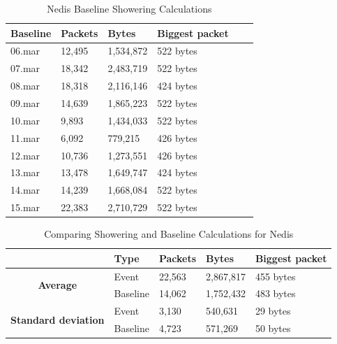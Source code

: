 \begin{table}[H]
    \centering
    \caption{Nedis Baseline Showering Calculations}
    \begin{tabular}{|l|l|l|l|l|l|}
    \hline
        \textbf{Baseline} & \textbf{Packets} & \textbf{Bytes} & \textbf{Biggest packet} \\ \hline
        06.mar & 12,495 & 1,534,872 & 522 bytes \\ \hline
        07.mar & 18,342 & 2,483,719 & 522 bytes \\ \hline
        08.mar & 18,318 & 2,116,146 & 424 bytes \\ \hline
        09.mar & 14,639 & 1,865,223 & 522 bytes \\ \hline
        10.mar & 9,893  & 1,434,033 & 522 bytes \\ \hline
        11.mar & 6,092  & 779,215   & 426 bytes \\ \hline
        12.mar & 10,736 & 1,273,551 & 426 bytes \\ \hline
        13.mar & 13,478 & 1,649,747 & 424 bytes \\ \hline
        14.mar & 14,239 & 1,668,084 & 522 bytes \\ \hline
        15.mar & 22,383 & 2,710,729 & 522 bytes \\ \hline
    \end{tabular}
    \label{tab:NedisBaselineShowerCalculations}
\end{table}

\begin{table}[H]
    \centering
    \caption{Comparing Showering and Baseline Calculations for Nedis}
    \begin{tabular}{c|l|l|l|l|}
        \cline{2-5}
        \multicolumn{1}{l|}{}                                              & \textbf{Type} & \textbf{Packets} & \textbf{Bytes} & \textbf{Biggest packet} \\ \hline
        \multicolumn{1}{|c|}{\multirow{2}{*}{\textbf{Average}}}            & Event         & 22,563             & 2,867,817       & 455 bytes               \\ \cline{2-5} 
        \multicolumn{1}{|c|}{}                                             & Baseline      & 14,062             & 1,752,432       & 483 bytes                \\ \hline
        \multicolumn{1}{|c|}{\multirow{2}{*}{\textbf{Standard deviation}}} & Event         & 3,130              & 540,631         & 29 bytes                 \\ \cline{2-5} 
        \multicolumn{1}{|c|}{}                                             & Baseline      & 4,723              & 571,269         & 50 bytes               \\ \hline          
    \end{tabular}
    \label{tab:NedisComparingBaselineAndShowerCalculations}
\end{table}

